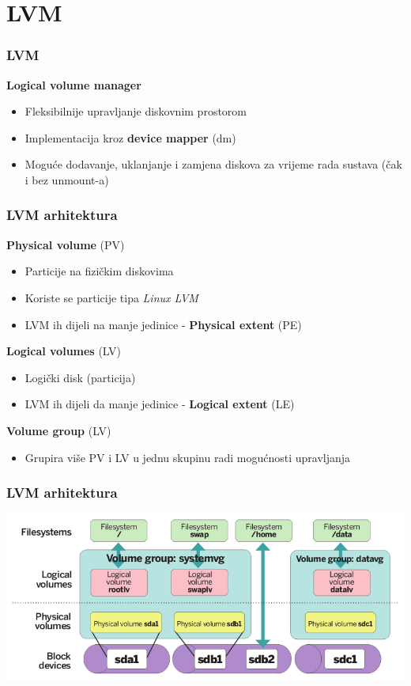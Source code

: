 \documentclass[t]{beamer}
\begin{document}
\section{LVM}
\begin{frame}
	\frametitle{LVM}
	\textbf{Logical volume manager}
	\begin{itemize}
		\item Fleksibilnije upravljanje diskovnim prostorom
		\item Implementacija kroz \textbf{device mapper} (dm)
	\end{itemize}
	\begin{itemize}
		\item Moguće dodavanje, uklanjanje i zamjena diskova za vrijeme rada sustava (čak i bez unmount-a)
	\end{itemize}
\end{frame}

\begin{frame}
	\frametitle{LVM arhitektura}
	\textbf{Physical volume} (PV)
	\begin{itemize}
		\item Particije na fizičkim diskovima
		\item Koriste se particije tipa \emph{Linux LVM}
		\item LVM ih dijeli na manje jedinice - \textbf{Physical extent} (PE)
	\end{itemize}
	\textbf{Logical volumes} (LV)
	\begin{itemize}
		\item Logički disk (particija)
		\item LVM ih dijeli da manje jedinice - \textbf{Logical extent} (LE)
	\end{itemize}
	\vfill
	\textbf{Volume group} (LV)
	\begin{itemize}
		\item Grupira više PV i LV u jednu skupinu radi mogućnosti upravljanja
	\end{itemize}
	\textbf{}
\end{frame}

\begin{frame}
	\frametitle{LVM arhitektura}
	\includegraphics[width=\textwidth]{lvm_arch.png}
\end{frame}
\end{document}
